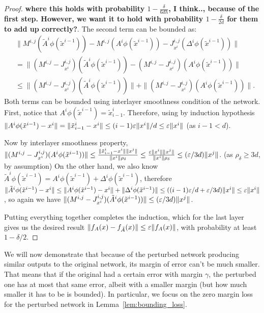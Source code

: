 \begin{proof}
    \textbf{where this holds with probability $1-\frac{\delta}{6dh}$, I think.., because of the first step. However, we want it to hold with probability $1-\frac{\delta}{2d}$ for them to add up correctly?}. The second term can be bounded as:
    \begin{align*}
    & \|M^{i,j}(\tilde{A}^i \phi(\tilde{x}^{i-1})) - M^{i,j}(A^i \phi(\tilde{x}^{i-1})) - J^{i,j}_{x^i}(\Delta^i\phi( \tilde{x}^{i-1}))\| \\
    & = \|(M^{i,j}-J^{i,j}_{x^i})(\tilde{A}^i \phi(\tilde{x}^{i-1})) - (M^{i,j}-J^{i,j}_{x^i})(A^i \phi(\tilde{x}^{i-1}))\| \\
    & \leq \|(M^{i,j}-J^{i,j}_{x^i})(\tilde{A}^i \phi(\tilde{x}^{i-1}))\| + \|(M^{i,j}-J^{i,j}_{x^i})(A^i \phi(\tilde{x}^{i-1}))\|.
    \end{align*}
    Both terms can be bounded using interlayer smoothness condition of the network.
    First, notice that $A^i\phi(\tilde{x}^{i-1}) = \tilde{x}^i_{i-1}$.
    Therefore, using by induction hypothesis $\|A^i\phi(\tilde{x}^{i-1}) - x^i\| = \|\tilde{x}^i_{i-1} - x^i\| \le (i-1)\eps\|x^i\|/d \le \eps\|x^i\|$ (as $i-1 < d$).
    
    Now by interlayer smoothness property, $\|(M^{i,j}-J^{i,j}_{x^i})(A^i \phi(\tilde{x}^{i-1}))\| \le \frac{\| \tilde{x}^i_{i-1} - x^i\| \| x^j\|}{\|x^i\| \rho_{\delta}} \le \frac{\eps \|x^i\| \| x^j\|}{\|x^i\| \rho_{\delta}} \le (\eps/3d)\|x^j\|$. (as $\rho_{\delta} \geq 3d$, by assumption)
    On the other hand, we also know $\tilde{A}^i\phi(\tilde{x}^{i-1}) = A^i\phi(\tilde{x}^{i-1}) + \Delta^i\phi(\tilde{x}^{i-1})$, therefore $\|\tilde{A}^i\phi(\tilde{x}^{i-1}) - x^i\| \le \|A^i\phi(\tilde{x}^{i-1}) - x^i\| + \|\Delta^i\phi(\tilde{x}^{i-1})\| \le ((i-1)\eps/d+\eps/3d)\|x^i\| \le \eps \|x^i\|$, so again we have $\|(M^{i,j}-J^{i,j}_{x^i})(\tilde{A}^i \phi(\tilde{x}^{i-1}))\| \le (\eps/3d)\|x^j\|$.
    
    Putting everything together completes the induction, which for the last layer gives us the desired result $\|f_A(x) - f_{\tilde{A}}(x)\| \le \eps\|f_A(x)\|$, with probability at least $1-\delta/2$.

\end{proof}

We will now demonstrate that because of the perturbed network producing similar outputs to the original network, its margin of error can't be much smaller. That means that if the original had a certain error with margin $\gamma$, the perturbed one has at most that same error, albeit with a smaller margin (but how much smaller it has to be is bounded). In particular, we focus on the zero margin loss for the perturbed network in Lemma~\ref{lem:bounding_loss}.

